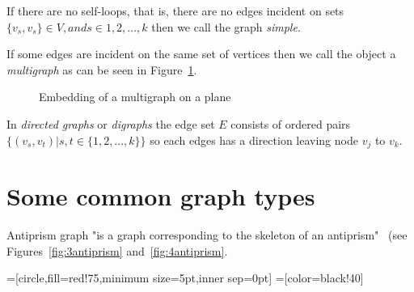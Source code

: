 If there are no self-loops, that is, there are no edges incident on sets $ \{ v_s, v_s\} \in V, and s \in {1, 2, ..., k} $ 
then we call the graph \textit{simple}.

If some edges are incident on the same set of vertices then we call the object a \textit{multigraph} as can be seen in 
Figure~\ref{fig:multi}.

\begin{figure}[ht]
  \caption{Embedding of a multigraph on a plane}
  \label{fig:multi}
\end{figure}

In \textit{directed graphs} or \textit{digraphs} the edge set $ E $ consists of ordered pairs $ \{(v_s, v_t) | s,t \in \{1, 2, ..., k\}\} $ 
so each edges has a direction leaving node $ v_j $ to $ v_k $.

\section{Some common graph types}

Antiprism graph "is a graph corresponding to the skeleton of an antiprism"~\autocite{weisstein2008antiprism} (see Figures~\ref{fig:3antiprism} and~\ref{fig:4antiprism}.

=[circle,fill=red!75,minimum size=5pt,inner sep=0pt]
=[color=black!40]

